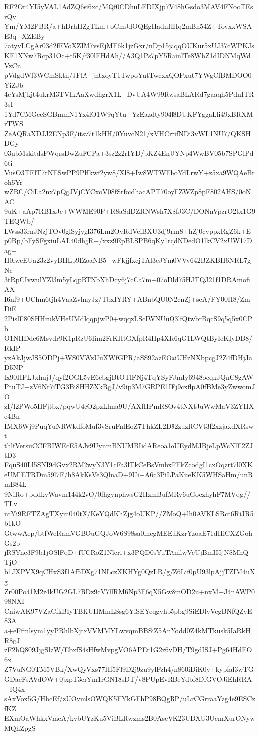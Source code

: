RF2Or4YI5yVAL1AdZQ6si6xc/MQf0CDhuLFDIXjp7V48hGsdo3MAV4FNooTEsrQv
Ym/YM2PBR/a+hDrhHZgTLm+oCmJdOQEgHadnHHq2mBh54Z+TovxxWSAE3q+XZEBy
7atyvLCgAr03d2fEVoXZIM7vsEjMF6k1jzGxr/nDp15jaqqOUKur5xUJ37cWPKJs
KF1XNw7Rcp31Oc+t5K/f30lEHdAh//A3Q1Ps7pY5RainlTe8WhZ1dIDNMqWdVzCn
pVdgdWf3WCmSktn/JFlA+jhtxoyT1TwpoYutTwcxxQOPxut7YWgCfBMDOO0YiZJb
4cYsMjkjt4ukrM3TVIkAaXwdhgrX1L+DvUA4W99RwsaBLARd7gaaqh5PdnITR3sI
1Yd7CMGeeSGBmmN1Yx4lO1W9qYtu+YzEazdty904l8DUKFYggaLli49xBRXMrTWS
ZeAQRaXDJJ2ENp3F/itsv7t1kHH/0YuvcN21/xVHCrrifNDi3vWL1NU7/QKSHDGy
03ubMskitdsFWqrsDwZuFCPa+3sz2z2rIYD/bKZ4EnUYNp4WwBV05b7SPGlPd6ti
VusO3TElT7rNESwPP9PHkwf2yw8/Xl8+Iw8WTWFboYdLrwY+z5xa9WQAeBroh5Yr
wZRC/CiLa2nx7pQgJVjCYCxoV08fSrfoidhacAPT70oyFZWZp8pF802AHS/0oNAC
9uK+aAp7RB1xJc+WWME90P+R8aSdDZRNWsh7XSfJ3C/DONnVpzrO2tx1G9TEQWb/
LWss33rnJNzjTOv0glSyjygI376Lm2OyRdVeiBXU3dj9nm8+hZj0cvppxRgZ6k+E
p0Bp/bFySFgxiuLAL40dhgR+/xxz9EpBLSPB6qKy1rqdNDedO1lkCV2xUW17Dag+
H0lwcEUa23z2vyBHLp9IZoaNB5+wFkjjfxcjTAl3eJYm0VVv642BZKBH6NRL7gNc
3tRpCIvwulYZl3m5yLqpRTNbXhDcy6j7cCa7m+07oDId75HJTQJ21f1DRAmofiAX
I6nf9+UChm6tjh4VaaZvhnyJz/TbxIYRY+ABnbQU0N2cnZj+seA/FY00H8/ZmDiE
2PislF80SHHrukVHeUMdIqqpjwP0+wqqzLScIWNUuQ3lfQtwbrBqcS9q5q5x0CPb
O1NHDde6Msvdr9K1pRzU6Iim2FrKHtGXfpR4Hp4XK6qG1LWQtByIeKIyDB8/RkIP
yzAkJjwJS5ODPj+WS0VWzUuXWfGPR/aSS92azEOaiUHzNXbpcgJ2Z4fDHjJaD5NP
lx90HPLJxhujJ/qyf2OGL5vE6cbgjBtOTlFNj4TqYSyFJmIy6948ocqkJQnC8gAW
PtuTJ+zV6Nr7iTG3Bi8HHZXkRgJ/v9ip3M7GRPE1IFj9cxflpA0fBMe3yZwwomJO
zI/l2PWo5HFjtbx/pqwU4eO2pzLlma9U/AXfHPmR8Ov4tNXtJuWwMaV3ZYHXe4Bn
IMX6Wj9PuqYuNRWkdfoMuf3vSruFnlEoZ7ThkZL2D92zuzRCVt3f2xzjaxdXRswt
thlfVersuCCFBIWEcE5AJv9UynmBNUMBIidAReoa1oUEydMJBjeLpWcNlF2ZJtD3
FquS40Ll5SNI9dGvx2RM2wyN3Y1cFa3lTkCeBsVmbxFFkZcodgI1cxOqzrt7l0XK
eUMlETRDm59l7F/h8AkKsVe3QlnaD+9Ui+A6c3PiLPaKueKK5WHSaHm/unRmB84L
9NiRo+pddkyWavm144k2vO/0fhgynphwsG2HzmBufMRy6uGoczhyhF7MVqg//TLv
ntYi9RFTZAgTXym040tX/KeYQdKhZjg4oUKP//ZMoQ+lh0AVKLSRct6RiJR5b1kO
GtwwAep/btfWeRamVGBOuGQJoW6S98sa0lncgMEEdKzrYzoaE71dHiCXZGohGs2b
jRSYne3F9b1jOSlFqD+fUCRoZ1Nlcri+x3PQD0sYuTAmlwVcUjBmH5jN8MhQ+TjO
b1JXPVX9qCHxS3f1Af5DXg71NLczXKHYg0QzLR/g/Z6Lif0pU93lpAjjTZIM4uXg
Zr00Po41M2r4kUG2GL7RDz9cV7llRM6Np3F6qX5Gw8mOD2u+nxM+J4nAWP098NXI
CniwAK97VZaCfkBIyTBKUHMmLSsg6YiSEYeqgyhb5pbg9SiEDlvVcgBNfQZyE83A
a+eFfmlsym1yyPRhlbXjtxVVMMYLwvqmBBSiZ5AnYodd0Z4kMTkusk5IaRkHR8gJ
zF2hQ809JjgSlzW/EbxfS4sHfwMvpgVO6APEr1G2z6vDH/T9gdISJ+Pg64HdEO6x
Z7VuNG0TM5VBk/XwQyVxs77Hf5Fl9D2j9zu9ylFzh4/n860iDiK0y+kypfal3wTG
GDaeFsAVdOW+0jxpT3erYm1rGN18sDT/v8PUpEvRBeYdbf8DfGVOJiEhRRA+IQ4x
sAxVox5G/HhcEf/zUOvmlsOWQK5FYkGFhP98BQgBP/uLrCGrraaYzg4e9ESCzfKZ
EXmOaWhkxVmeA/kvbUYzKu5ViBLRwzms2B0AscVK23UDXU3UcmXurONywMQhZpgS
